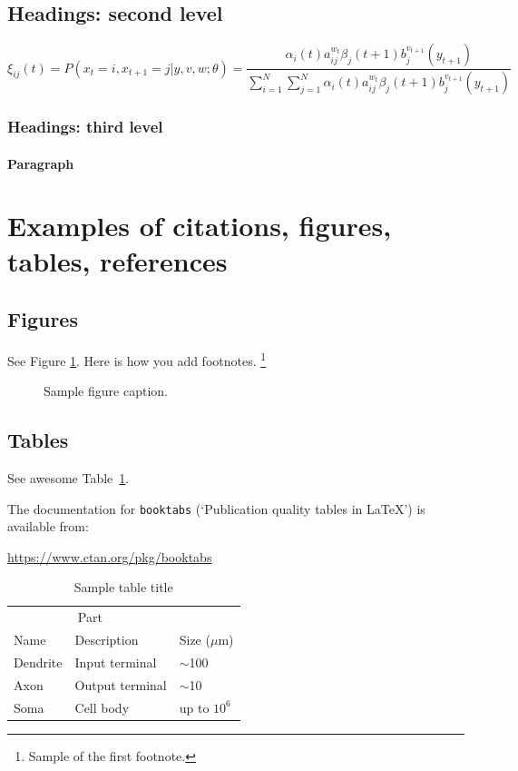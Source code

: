 \documentclass{article}
\begin{document}
\subsection{Headings: second level}
\lipsum[5]
\begin{equation}
	\xi _{ij}(t)=P(x_{t}=i,x_{t+1}=j|y,v,w;\theta)= {\frac {\alpha _{i}(t)a^{w_t}_{ij}\beta _{j}(t+1)b^{v_{t+1}}_{j}(y_{t+1})}{\sum _{i=1}^{N} \sum _{j=1}^{N} \alpha _{i}(t)a^{w_t}_{ij}\beta _{j}(t+1)b^{v_{t+1}}_{j}(y_{t+1})}}
\end{equation}

\subsubsection{Headings: third level}
\lipsum[6]

\paragraph{Paragraph}
\lipsum[7]



\section{Examples of citations, figures, tables, references}
\label{sec:others}

\subsection{Figures}
\lipsum[10]
See Figure \ref{fig:fig1}. Here is how you add footnotes. \footnote{Sample of the first footnote.}
\lipsum[11]

\begin{figure}
	\centering
	\fbox{\rule[-.5cm]{4cm}{4cm} \rule[-.5cm]{4cm}{0cm}}
	\caption{Sample figure caption.}
	\label{fig:fig1}
\end{figure}

\subsection{Tables}
See awesome Table~\ref{tab:table}.

The documentation for \verb+booktabs+ (`Publication quality tables in LaTeX') is available from:
\begin{center}
	\url{https://www.ctan.org/pkg/booktabs}
\end{center}


\begin{table}
	\caption{Sample table title}
	\centering
	\begin{tabular}{lll}
		\toprule
		\multicolumn{2}{c}{Part}                   \\
		\cmidrule(r){1-2}
		Name     & Description     & Size ($\mu$m) \\
		\midrule
		Dendrite & Input terminal  & $\sim$100     \\
		Axon     & Output terminal & $\sim$10      \\
		Soma     & Cell body       & up to $10^6$  \\
		\bottomrule
	\end{tabular}
	\label{tab:table}
\end{table}
\end{document}
